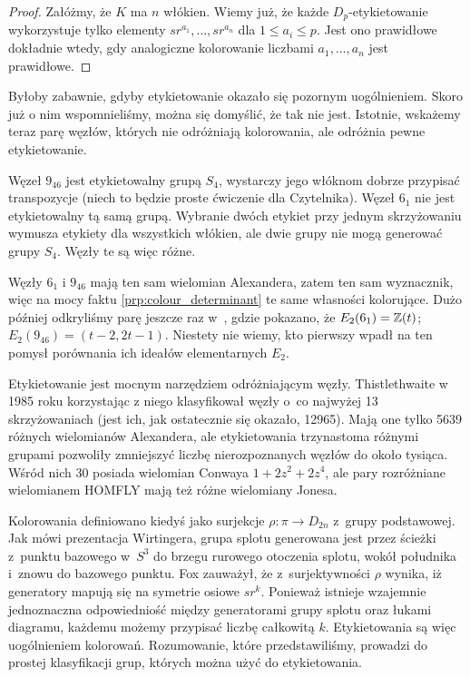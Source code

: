 \begin{proof}
    Załóżmy, że $K$ ma $n$ włókien.
    Wiemy już, że każde $D_p$-etykietowanie wykorzystuje tylko elementy $sr^{a_1}, \ldots, sr^{a_n}$ dla $1 \le a_i \le p$.
    Jest ono prawidłowe dokładnie wtedy, gdy analogiczne kolorowanie liczbami $a_1, \ldots, a_n$ jest prawidłowe.
\end{proof}

Byłoby zabawnie, gdyby etykietowanie okazało się pozornym uogólnieniem.
Skoro już o nim wspomnieliśmy, można się domyślić, że tak nie jest.
Istotnie, wskażemy teraz parę węzłów, których nie odróżniają kolorowania, ale odróżnia pewne etykietowanie.

\begin{example}
    Węzeł $9_{46}$ jest etykietowalny grupą $S_4$, wystarczy jego włóknom dobrze przypisać transpozycje (niech to będzie proste ćwiczenie dla Czytelnika).
    Węzeł $6_1$ nie jest etykietowalny tą samą grupą.
    Wybranie dwóch etykiet przy jednym skrzyżowaniu wymusza etykiety dla wszystkich włókien, ale dwie grupy nie mogą generować grupy $S_4$.
    Węzły te są więc różne.
\end{example}

Węzły $6_1$ i $9_{46}$ mają ten sam wielomian Alexandera, zatem ten sam wyznacznik, więc na mocy faktu \ref{prp:colour_determinant} te same własności kolorujące.
%
Dużo później odkryliśmy parę jeszcze raz w~\cite[s. 138]{burde2014}, gdzie pokazano, że  $E_2(6_1) = \mathbb Z(t)$; $E_2(9_{46}) = (t-2, 2t-1)$.
Niestety nie wiemy, kto pierwszy wpadł na ten pomysł porównania ich ideałów elementarnych $E_2$. 

Etykietowanie jest mocnym narzędziem odróżniającym węzły.
Thistlethwaite w 1985 roku korzystając z niego klasyfikował węzły o~co najwyżej 13 skrzyżowaniach (jest ich, jak ostatecznie się okazało, 12965).
%
Mają one tylko 5639 różnych wielomianów Alexandera, ale etykietowania trzynastoma różnymi grupami pozwoliły zmniejszyć liczbę nierozpoznanych węzłów do około tysiąca.
Wśród nich 30 posiada wielomian Conwaya $1 + 2z^2 + 2z^4$, ale pary rozróżniane wielomianem HOMFLY mają też różne wielomiany Jonesa.

Kolorowania definiowano kiedyś jako surjekcje $\rho \colon \pi \to D_{2n}$ z~grupy podstawowej.
Jak mówi prezentacja Wirtingera, grupa splotu generowana jest przez ścieżki z~punktu bazowego w~$S^3$ do brzegu rurowego otoczenia splotu, wokół południka i~znowu do bazowego punktu.
%
Fox zauważył, że z~surjektywności $\rho$ wynika, iż generatory mapują się na symetrie osiowe $sr^k$.
Ponieważ istnieje wzajemnie jednoznaczna odpowiedniość między generatorami grupy splotu oraz łukami diagramu, każdemu możemy przypisać liczbę całkowitą $k$.
Etykietowania są więc uogólnieniem kolorowań.
Rozumowanie, które przedstawiliśmy, prowadzi do prostej klasyfikacji grup, których można użyć do etykietowania.

